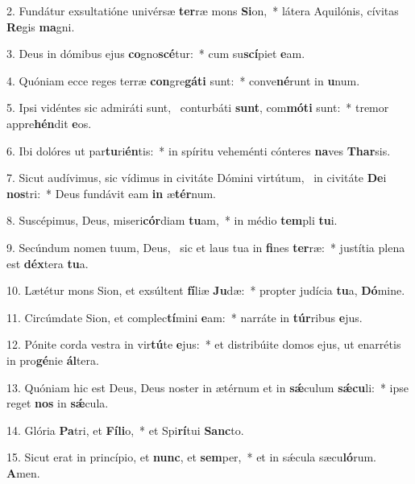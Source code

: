 2. Fundátur exsultatióne univérsæ \textbf{ter}ræ mons \textbf{Si}on,~*  látera Aquilónis, cívitas \textbf{Re}gis \textbf{ma}gni.\

3. Deus in dómibus ejus \textbf{co}gno\textbf{scé}tur:~*  cum su\textbf{scí}piet \textbf{e}am.\

4. Quóniam ecce reges terræ \textbf{con}gre\textbf{gá}\textbf{ti} sunt:~*  conve\textbf{né}runt in \textbf{u}num.\

5. Ipsi vidéntes sic admiráti sunt, \dag\  conturbáti \textbf{sunt}, com\textbf{mó}\textbf{ti} sunt:~*  tremor appre\textbf{hén}dit \textbf{e}os.\

6. Ibi dolóres ut par\textbf{tu}ri\textbf{én}tis:~*  in spíritu veheménti cónteres \textbf{na}ves \textbf{Thar}sis.\

7. Sicut audívimus, sic vídimus in civitáte Dómini virtútum, \dag\  in civitáte \textbf{De}i \textbf{nos}tri:~*  Deus fundávit eam \textbf{in} æ\textbf{tér}num.\

8. Suscépimus, Deus, miseri\textbf{cór}diam \textbf{tu}am,~*  in médio \textbf{tem}pli \textbf{tu}i.\

9. Secúndum nomen tuum, Deus, \dag\  sic et laus tua in \textbf{fi}nes \textbf{ter}ræ:~*  justítia plena est \textbf{déx}tera \textbf{tu}a.\

10. Lætétur mons Sion, et exsúltent \textbf{fí}liæ \textbf{Ju}dæ:~*  propter judícia \textbf{tu}a, \textbf{Dó}mine.\

11. Circúmdate Sion, et complec\textbf{tí}mini \textbf{e}am:~*  narráte in \textbf{túr}ribus \textbf{e}jus.\

12. Pónite corda vestra in vir\textbf{tú}te \textbf{e}jus:~*  et distribúite domos ejus, ut enarrétis in pro\textbf{gé}nie \textbf{ál}tera.\

13. Quóniam hic est Deus, Deus noster in ætérnum et in \textbf{sǽ}culum \textbf{sǽ}\textbf{cu}li:~*  ipse reget \textbf{nos} in \textbf{sǽ}cula.\

14. Glória \textbf{Pa}tri, et \textbf{Fí}\textbf{li}o,~*  et Spi\textbf{rí}tui \textbf{Sanc}to.\

15. Sicut erat in princípio, et \textbf{nunc}, et \textbf{sem}per,~*  et in sǽcula sæcu\textbf{ló}rum. \textbf{A}men.\


